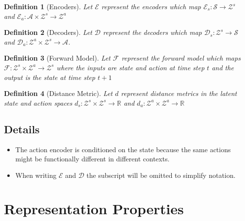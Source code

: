 \documentclass{article}
\newtheorem{definition}{Definition}
\begin{document}
\begin{definition} [Encoders]
    Let $\mathcal{E}$ represent the encoders which map $\mathcal{E}_s: \mathcal{S}\rightarrow\mathcal{Z}^s$ and $\mathcal{E}_a: \mathcal{A} \times \mathcal{Z}^s \rightarrow \mathcal{Z}^a$
\end{definition}
\begin{definition} [Decoders]
    Let $\mathcal{D}$ represent the decoders which map $\mathcal{D}_s: \mathcal{Z}^s \rightarrow \mathcal{S}$ and $\mathcal{D}_a: \mathcal{Z}^a \times \mathcal{Z}^s \rightarrow \mathcal{A}$.
\end{definition}
\begin{definition} [Forward Model]
    Let $\mathcal{F}$ represent the forward model which maps $\mathcal{F}: \mathcal{Z}^s \times \mathcal{Z}^a \rightarrow \mathcal{Z}^s$ where the inputs are state and action at time step $t$ and the output is the state at time step $t+1$
\end{definition}
\begin{definition} [Distance Metric]
    Let $d$ represent distance metrics in the latent state and action spaces $d_s: \mathcal{Z}^s \times \mathcal{Z}^s \rightarrow \mathbb{R}$ and $d_a: \mathcal{Z}^a \times \mathcal{Z}^a \rightarrow \mathbb{R}$
\end{definition}

\subsection*{Details}

\begin{itemize}
    \item The action encoder is conditioned on the state because the same actions might be functionally different in different contexts.
    \item When writing $\mathcal{E}$ and $\mathcal{D}$ the subscript will be omitted to simplify notation.
\end{itemize}


\section{Representation Properties}
\end{document}
